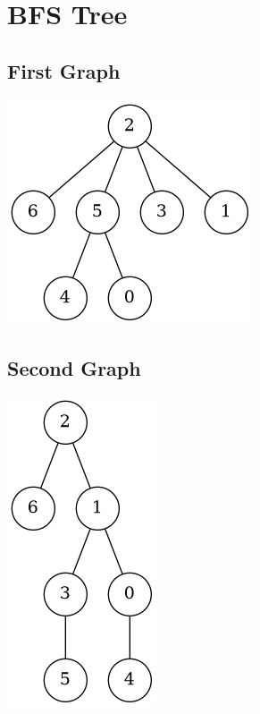 \documentclass[a4paper,12pt]{extarticle}
\newcommand{\image}[2] {
  \noindent\begin{minipage}[c]{.6\textwidth}%
    \centering
    \strut\vspace*{-\baselineskip}\newline\texttt{[image: \#1]}
  \end{minipage}%
  \hfill%
  \begin{minipage}[c]{.4\textwidth}
    #2
  \end{minipage}
}
\begin{document}
	\newpage

	\section{BFS Tree}

	\subsection{First Graph}

	\includegraphics[scale=.6]{bfs/1}

	\subsection{Second Graph}

	\includegraphics[scale=.6]{bfs/2}



\end{document}
